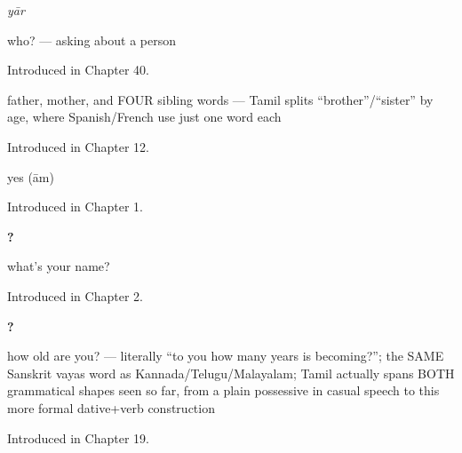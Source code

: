 \noindent\begin{minipage}[t]{\linewidth}
\raggedright
\textbf{}\enspace\emph{yār}\par
\small who? — asking about a person\par
\footnotesize Introduced in Chapter 40.
\end{minipage}\par\medskip

\noindent\begin{minipage}[t]{\linewidth}
\raggedright
\textbf{     }\par
\small father, mother, and FOUR sibling words — Tamil splits \textquotedblleft{}brother\textquotedblright{}/\textquotedblleft{}sister\textquotedblright{} by age, where Spanish/French use just one word each\par
\footnotesize Introduced in Chapter 12.
\end{minipage}\par\medskip

\noindent\begin{minipage}[t]{\linewidth}
\raggedright
\textbf{}\par
\small yes (ām)\par
\footnotesize Introduced in Chapter 1.
\end{minipage}\par\medskip

\noindent\begin{minipage}[t]{\linewidth}
\raggedright
\textbf{  ?}\par
\small what's your name?\par
\footnotesize Introduced in Chapter 2.
\end{minipage}\par\medskip

\noindent\begin{minipage}[t]{\linewidth}
\raggedright
\textbf{   ?}\par
\small how old are you? — literally \textquotedblleft{}to you how many years is becoming?\textquotedblright{}; the SAME Sanskrit vayas word as Kannada/Telugu/Malayalam; Tamil actually spans BOTH grammatical shapes seen so far, from a plain possessive in casual speech to this more formal dative+verb construction\par
\footnotesize Introduced in Chapter 19.
\end{minipage}\par\medskip

